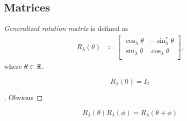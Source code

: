 \documentclass[../main.tex]{subfiles}
\begin{document}
\subsection{Matrices}
\begin{definition}\label{M:Rotation}
\textit{Generalized rotation matrix} is defined as
\begin{align*}
R_\lambda\left(\theta\right)&\coloneqq
\begin{bmatrix}
\cos_\lambda{\theta}&-\sin_\lambda^\ast{\theta}\\
\sin_\lambda{\theta}&\cos_\lambda{\theta}\\
\end{bmatrix}\text{,}
\end{align*}
where \(\theta\in\mathbb{R}\).
\end{definition}
\begin{corollary}\label{M:Rotation:Identity}
\[
R_\lambda\left(0\right)
=
I_2
\]
\end{corollary}
\begin{proof}[]
Obvious
\end{proof}
\begin{corollary}\label{M:Rotation:Sum}
\[
R_\lambda\left(\theta\right)R_\lambda\left(\phi\right)=R_\lambda\left(\theta+\phi\right)
\]
\end{corollary}
\end{document}
